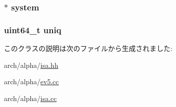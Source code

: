 \label{classAlphaISA_1_1ISA_a5379df879a195cd227c4b3e04fc324d4}
\hypertarget{classAlphaISA_1_1ISA_af27ccd765f13a4b7bd119dc7579e2746}{
\subsubsection[{system}]{$\ast$ {\bf system}}}
\label{classAlphaISA_1_1ISA_af27ccd765f13a4b7bd119dc7579e2746}
\hypertarget{classAlphaISA_1_1ISA_a4bf79f35bed3cb9ecd35cc65ec6400c7}{
\subsubsection[{uniq}]{\setlength{\rightskip}{0pt plus 5cm}uint64\_\-t {\bf uniq}}}
\label{classAlphaISA_1_1ISA_a4bf79f35bed3cb9ecd35cc65ec6400c7}


このクラスの説明は次のファイルから生成されました:\begin{DoxyCompactItemize}
\item 
arch/alpha/\hyperlink{alpha_2isa_8hh}{isa.hh}\item 
arch/alpha/\hyperlink{ev5_8cc}{ev5.cc}\item 
arch/alpha/\hyperlink{alpha_2isa_8cc}{isa.cc}\end{DoxyCompactItemize}
